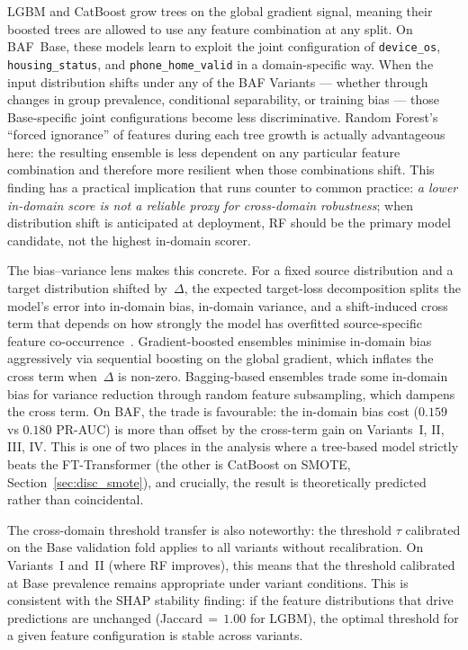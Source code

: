 \documentclass[a4paper,fleqn]{cas-sc}
\begin{document}
LGBM and CatBoost grow trees on the global gradient signal, meaning their
boosted trees are allowed to use any feature combination at any split.
On BAF~Base, these models learn to exploit the joint configuration of
\texttt{device\_os}, \texttt{housing\_status}, and \texttt{phone\_home\_valid}
in a domain-specific way.
When the input distribution shifts under any of the BAF Variants ---
whether through changes in group prevalence, conditional separability, or
training bias --- those Base-specific joint configurations become less
discriminative.
Random Forest's ``forced ignorance'' of features during each tree growth
is actually advantageous here: the resulting ensemble is less dependent on
any particular feature combination and therefore more resilient when those
combinations shift.
This finding has a practical implication that runs counter to common practice:
\emph{a lower in-domain score is not a reliable proxy for cross-domain robustness};
when distribution shift is anticipated at deployment, RF should be the primary
model candidate, not the highest in-domain scorer.

The bias--variance lens makes this concrete.
For a fixed source distribution and a target distribution shifted by~$\Delta$,
the expected target-loss decomposition splits the model's error into
in-domain bias, in-domain variance, and a shift-induced cross term that
depends on how strongly the model has overfitted source-specific feature
co-occurrence~\citep{breiman2001random}.
Gradient-boosted ensembles minimise in-domain bias aggressively via
sequential boosting on the global gradient, which inflates the cross term
when~$\Delta$ is non-zero.
Bagging-based ensembles trade some in-domain bias for variance reduction
through random feature subsampling, which dampens the cross term.
On BAF, the trade is favourable: the in-domain bias cost ($0.159$ vs $0.180$
PR-AUC) is more than offset by the cross-term gain on Variants~I, II, III, IV.
This is one of two places in the analysis where a tree-based model strictly
beats the FT-Transformer (the other is CatBoost on SMOTE,
Section~\ref{sec:disc_smote}), and crucially, the result is theoretically
predicted rather than coincidental.

The cross-domain threshold transfer is also noteworthy: the threshold $\tau$
calibrated on the Base validation fold applies to all variants without recalibration.
On Variants~I and~II (where RF improves), this means that the
threshold calibrated at Base prevalence remains appropriate under variant conditions.
This is consistent with the SHAP stability finding: if the feature distributions
that drive predictions are unchanged (Jaccard\,$=\,1.00$ for LGBM), the optimal
threshold for a given feature configuration is stable across variants.
\end{document}
